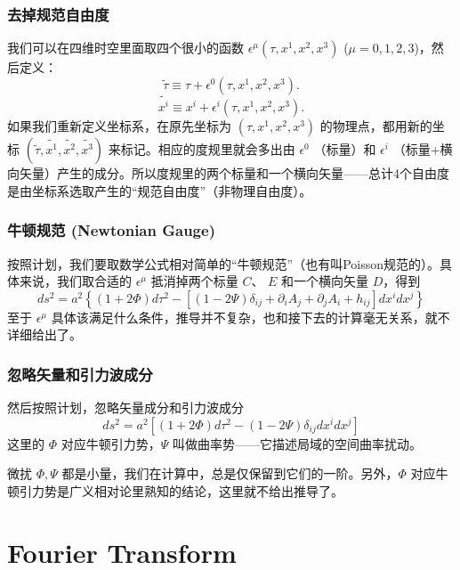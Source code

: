 \documentclass[CJK,13pt]{beamer}
\begin{document}
  
  \begin{frame}
    \frametitle{去掉规范自由度}
    我们可以在四维时空里面取四个很小的函数 $\epsilon^\mu(\tau, x^1, x^2, x^3)$ ($\mu=0,1,2,3$)，然后定义：
    $$\tilde{\tau} \equiv \tau + \epsilon^0(\tau, x^1, x^2, x^3).$$
    $$\tilde{x^i} \equiv x^i + \epsilon^i(\tau, x^1, x^2, x^3).$$
    如果我们重新定义坐标系，在原先坐标为 $(\tau, x^1, x^2, x^3)$ 的物理点，都用新的坐标 $(\tilde{\tau}, \tilde{x^1}, \tilde{x^2}, \tilde{x^3})$ 来标记。相应的度规里就会多出由 $\epsilon^0$ （标量）和 $\epsilon^i$ （标量+横向矢量）产生的成分。所以度规里的两个标量和一个横向矢量——总计4个自由度是由坐标系选取产生的“规范自由度”（非物理自由度）。


  \end{frame}


  \begin{frame}
    \frametitle{牛顿规范 (Newtonian Gauge)}
    按照计划，我们要取数学公式相对简单的“牛顿规范”（也有叫Poisson规范的）。具体来说，我们取合适的 $\epsilon^\mu$ 抵消掉两个标量 $C$、 $E$ 和一个横向矢量  $D$，得到
    {\small  $$ ds^2 = a^2\left\{\left(1+2\Phi\right)d\tau^2 - \left[\left(1-2\Psi\right)\delta_{ij}+ \partial_iA_j+\partial_jA_i + h_{ij}\right]dx^idx^j\right\}$$}
    至于  $\epsilon^\mu$ 具体该满足什么条件，推导并不复杂，也和接下去的计算毫无关系，就不详细给出了。
  \end{frame}


  \begin{frame}
    \frametitle{忽略矢量和引力波成分}
    然后按照计划，忽略矢量成分和引力波成分
      {\blue $$ ds^2 = a^2\left[\left(1+2\Phi\right)d\tau^2 - \left(1-2\Psi\right)\delta_{ij}dx^idx^j\right]$$}
      这里的 $\Phi$ 对应牛顿引力势，$\Psi$ 叫做曲率势——它描述局域的空间曲率扰动。

      \skipline

      {\blue 微扰 $\Phi,\Psi$ 都是小量，我们在计算中，总是仅保留到它们的一阶。另外，$\Phi$ 对应牛顿引力势是广义相对论里熟知的结论，这里就不给出推导了。}

      \skipline
      
  \end{frame}

  \section{Fourier Transform}
  
\end{document}
